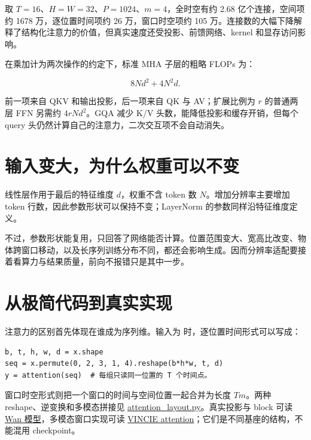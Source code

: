 取 \(T=16\)、\(H=W=32\)、\(P=1024\)、\(m=4\)，全时空有约 2.68 亿个连接，空间项约 1678 万，逐位置时间项约 26 万，窗口时空项约 105 万。连接数的大幅下降解释了结构化注意力的价值，但真实速度还受投影、前馈网络、kernel 和显存访问影响。

在乘加计为两次操作的约定下，标准 MHA 子层的粗略 FLOPs 为：

\[
8Nd^2+4N^2d.
\]

前一项来自 QKV 和输出投影，后一项来自 QK 与 AV；扩展比例为 \(r\) 的普通两层 FFN 另需约 \(4rNd^2\)。GQA 减少 K/V 头数，能降低投影和缓存开销，但每个 query 头仍然计算自己的注意力，二次交互项不会自动消失。

\section{输入变大，为什么权重可以不变}\label{seedance-m03-ux8f93ux5165ux53d8ux5927ux4e3aux4ec0ux4e48ux6743ux91cdux53efux4ee5ux4e0dux53d8}

线性层作用于最后的特征维度 \(d\)，权重不含 token 数 \(N\)。增加分辨率主要增加 token 行数，因此参数形状可以保持不变；LayerNorm 的参数同样沿特征维度定义。

不过，参数形状能复用，只回答了网络能否计算。位置范围变大、宽高比改变、物体跨窗口移动，以及长序列训练分布不同，都还会影响生成。因而分辨率适配要接着看算力与结果质量，前向不报错只是其中一步。

\section{从极简代码到真实实现}\label{seedance-m03-ux4eceux6781ux7b80ux4ee3ux7801ux5230ux771fux5b9eux5b9eux73b0}

注意力的区别首先体现在谁成为序列维。输入为  时，逐位置时间形式可以写成：

\begin{verbatim}
b, t, h, w, d = x.shape
seq = x.permute(0, 2, 3, 1, 4).reshape(b*h*w, t, d)
y = attention(seq)  # 每组只读同一位置的 T 个时间点。
\end{verbatim}

窗口时空形式则把一个窗口的时间与空间位置一起合并为长度 \(Tm\)。两种 reshape、逆变换和多模态拼接见 \hyperref[code-attention-layout]{attention\_layout.py}。真实投影与 block 可读 \href{https://github.com/Wan-Video/Wan2.1/blob/9737cba9c1c3c4d04b33fcad41c111989865d315/wan/modules/model.py}{Wan 模型}，多模态窗口实现可读 \href{https://github.com/ByteDance-Seed/VINCIE/blob/97cd2c5701e694dabcfea320c0cf59893d427fab/models/dit/blocks/attention/mmattn.py}{VINCIE attention}；它们是不同基座的结构，不能混用 checkpoint。
